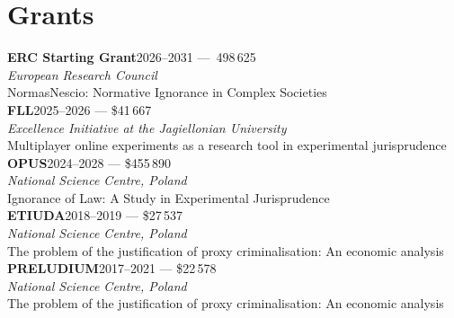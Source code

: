 \documentclass{resume}
\begin{document}
\begin{content}




\sectionlineskip
\end{content}

\newlength{\grantsep}
\setlength{\grantsep}{0.8em}     %

\newcommand{\grant}[5]{%
  \textbf{#2}\hfill #1 — \$#5\\[-0.3em]
  \emph{#3}\\[-0.3em]
  #4\\[\grantsep]}

\newcommand{\granteur}[5]{%
  \textbf{#2}\hfill #1 — \texteuro#5\\[-0.3em]
  \emph{#3}\\[-0.3em]
  #4\\[\grantsep]}

\section{Grants}
\begin{content}
  \granteur{2026–2031}{ERC Starting Grant}{European Research Council}
        {NormasNescio: Normative Ignorance in Complex Societies}
        {1\,498\,625}

  \grant{2025–2026}{FLL}{Excellence Initiative at the Jagiellonian University}
        {Multiplayer online experiments as a research tool in experimental jurisprudence}
        {41\,667}

  \grant{2024–2028}{OPUS}{National Science Centre, Poland}
        {Ignorance of Law: A Study in Experimental Jurisprudence}
        {455\,890}

  \grant{2018–2019}{ETIUDA}{National Science Centre, Poland}
        {The problem of the justification of proxy criminalisation: An economic analysis}
        {27\,537}

  \grant{2017–2021}{PRELUDIUM}{National Science Centre, Poland}
        {The problem of the justification of proxy criminalisation: An economic analysis}
        {22\,578}
\sectionlineskip
\end{content}
\end{document}
